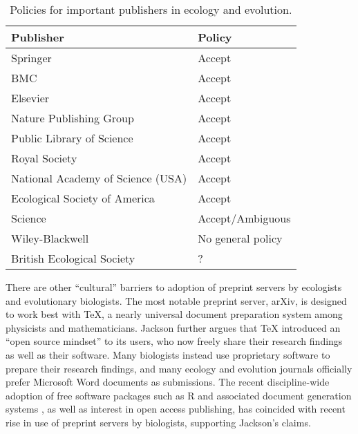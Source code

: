 \documentclass[letterpaper,twocolumn,superscriptaddress,showkeys]{revtex4}
\begin{document}
\begin{table*}
    \centering
    \begin{tabular}{|ll|}
    \hline
    Publisher                                   & Policy \\
    \hline
    Springer                                & Accept \\
    BMC                                     & Accept \\
    Elsevier                                & Accept \\
    Nature Publishing Group                 & Accept \\
    Public Library of Science               & Accept \\
    Royal Society                           & Accept \\
    National Academy of Science (USA)           & Accept \\
    Ecological Society of America           & Accept \\ %
    Science                                 & Accept/Ambiguous \\
    Wiley-Blackwell                         & No general policy \\ %
    British Ecological Society                  & ? \\ %
    \hline
    \end{tabular}
    \caption{Policies for important publishers in ecology and evolution.}
    \label{table:policies}
\end{table*}

There are other ``cultural'' barriers to adoption of preprint servers
by ecologists and evolutionary biologists.  The most notable preprint
server, arXiv, is designed to work best with \TeX{}, a nearly
universal document preparation system among physicists and
mathematicians.  Jackson \cite{jackson2002preprints} further argues
that \TeX{} introduced an ``open source mindset'' to its users, who
now freely share their research findings as well as their software.
Many biologists instead use proprietary software to prepare their
research findings, and many ecology and evolution journals officially
prefer Microsoft Word documents as submissions.  The recent
discipline-wide adoption of free software packages such as R and associated  document generation systems \cite{xie2012}, as well
as interest in open access publishing, has coincided with recent rise in use
of preprint servers by biologists, supporting Jackson's claims.
\end{document}
